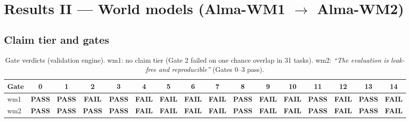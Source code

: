 \documentclass[10pt,a4paper]{extarticle}
\newcommand{\pass}{\textcolor{good}{\textbf{PASS}}}
\newcommand{\fail}{\textcolor{bad}{\textbf{FAIL}}}
\begin{document}
\section{Results II --- World models (Alma-WM1 $\rightarrow$ Alma-WM2)}
\subsection{Claim tier and gates}
\begin{table}[H]
\centering\small
\caption{Gate verdicts (validation engine). wm1: no claim tier (Gate 2 failed on one chance overlap in 31 tasks).
wm2: \emph{``The evaluation is leak-free and reproducible''} (Gates 0--3 pass).}
\label{tab:gates}
\setlength{\tabcolsep}{3pt}
\begin{tabular}{@{}l*{15}{c}@{}}
\toprule
Gate & 0 & 1 & 2 & 3 & 4 & 5 & 6 & 7 & 8 & 9 & 10 & 11 & 12 & 13 & 14 \\
\midrule
wm1 & \pass & \pass & \fail & \pass & \fail & \fail & \fail & \fail & \pass & \fail & \fail & \pass & \fail & \pass & \fail \\
wm2 & \pass & \pass & \pass & \pass & \fail & \fail & \fail & \fail & \pass & \fail & \fail & \pass & \fail & \pass & \fail \\
\bottomrule
\end{tabular}
\end{table}
\end{document}
